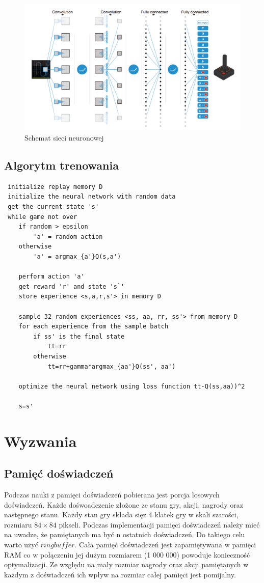 \documentclass[12pt]{article}
\begin{document}
\begin{figure}[H]
\centering \includegraphics[scale=0.3]{network.png}
\caption{Schemat sieci neuronowej \cite{deepmind_2}}
\label{simple1}
\end{figure}

\subsection{Algorytm trenowania}

\begin{lstlisting}
 initialize replay memory D
 initialize the neural network with random data
 get the current state 's'
 while game not over
 	if random > epsilon 
 		'a' = random action
 	otherwise
 		'a' = argmax_{a'}Q(s,a')

	perform action 'a'
	get reward 'r' and state 's`'
	store experience <s,a,r,s'> in memory D
	
	sample 32 random experiences <ss, aa, rr, ss'> from memory D
	for each experience from the sample batch
		if ss' is the final state 
			tt=rr
		otherwise
			tt=rr+gamma*argmax_{aa'}Q(ss', aa')
	
	optimize the neural network using loss function tt-Q(ss,aa))^2
	
	s=s'
\end{lstlisting}

\newpage

\section{Wyzwania}
\subsection{Pamięć doświadczeń}
Podczas nauki z pamięci doświadczeń pobierana jest porcja losowych doświadczeń. Każde dośwoadczenie złożone ze stanu gry, akcji, nagrody oraz następnego stanu. Każdy stan gry składa sięz 4 klatek gry w skali szarości, rozmiaru $84\times84$ pikseli. Podczas implementacji pamięci doświadczeń należy mieć na uwadze, że pamiętanych ma być n ostatnich doświadczeń. Do takiego celu warto użyć $ring buffer$. Cała pamięć doświadczeń jest zapamiętywana w pamięci RAM co w połączeniu jej dużym rozmiarem (1 000 000) powoduje konieczność optymalizacji. Ze względu na mały rozmiar nagrody oraz akcji pamiętanych w każdym z doświadczeń ich wpływ na rozmiar całej pamięci jest pomijalny.
\end{document}
